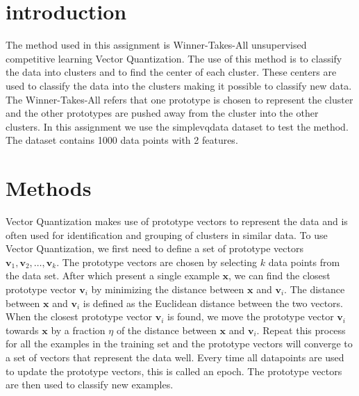 \documentclass[twoside, a4paper, fleqn, reqno]{article}
\begin{document}
\maketitle

\section{introduction}

The method used in this assignment is Winner-Takes-All unsupervised competitive learning Vector Quantization.
The use of this method is to classify the data into clusters and to find the center of each cluster.
These centers are used to classify the data into the clusters making it possible to classify new data.
The Winner-Takes-All refers that one prototype is chosen to represent the cluster and the other prototypes are pushed away from the cluster into the other clusters.
In this assignment we use the simplevqdata dataset to test the method.
The dataset contains 1000 data points with 2 features.

\section{Methods}

Vector Quantization makes use of prototype vectors to represent the data and is often used for identification and grouping of clusters in similar data.
To use Vector Quantization, we first need to define a set of prototype vectors $\mathbf{v}_1, \mathbf{v}_2, \ldots, \mathbf{v}_k$.
The prototype vectors are chosen by selecting $k$ data points from the data set.
After which present a single example $\mathbf{x}$, we can find the closest prototype vector $\mathbf{v}_i$ by minimizing the distance between $\mathbf{x}$ and $\mathbf{v}_i$.
The distance between $\mathbf{x}$ and $\mathbf{v}_i$ is defined as the Euclidean distance between the two vectors.
When the closest prototype vector $\mathbf{v}_i$ is found, we move the prototype vector $\mathbf{v}_i$ towards $\mathbf{x}$ by a fraction $\eta$ of the distance between $\mathbf{x}$ and $\mathbf{v}_i$.
Repeat this process for all the examples in the training set and the prototype vectors will converge to a set of vectors that represent the data well.
Every time all datapoints are used to update the prototype vectors, this is called an epoch.
The prototype vectors are then used to classify new examples. \\
\end{document}
